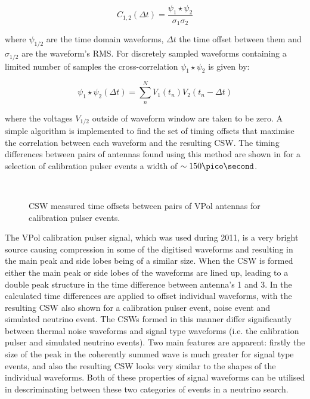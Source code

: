\begin{equation}
  C_{1,2}(\Delta t) = \frac{\psi_{1} \star \psi_{2}}{\sigma_{1} \sigma_{2}}
  \label{eq:analysis:Reconstruction:Normalised-Cross-Correlation}
\end{equation}

\noindent where $\psi_{1/2}$ are the time domain waveforms, $\Delta t$ the time offset between them and $\sigma_{1/2}$ are the waveform's RMS. For discretely sampled waveforms containing a limited number of samples the cross-correlation $\psi_{1} \star \psi_{2}$ is given by:

\begin{equation}
  \psi_{1} \star \psi_{2} (\Delta t) = \sum_{n}^{N} V_{1}(t_{n}) V_{2}(t_{n}-\Delta t)
  \label{eq:analysis:Reconstruction:Discrete-Cross-Correlation}
\end{equation}

\noindent where the voltages $V_{1/2}$ outside of waveform window are taken to be zero. A simple algorithm is implemented to find the set of timing offsets that maximise the correlation between each waveform and the resulting CSW. The timing differences between pairs of antennas found using this method are shown in  for a selection of calibration pulser events a width of $\sim 150 \pico \second$. 

\begin{figure}[htpb]
  \hfill
  \\
  \caption{CSW measured time offsets between pairs of VPol antennas for calibration pulser events.}
  \label{fig:analysis:Reconstruction:CSW-DeltaT}
\end{figure}


The VPol calibration pulser signal, which was used during 2011, is a very bright source causing compression in some of the digitised waveforms and resulting in the main peak and side lobes being of a similar size. When the CSW is formed either the main peak or side lobes of the waveforms are lined up, leading to a double peak structure in the time difference between antenna's 1 and 3. In  the calculated time differences are applied to offset individual waveforms, with the resulting CSW also shown for a calibration pulser event, noise event and simulated neutrino event. The CSWs formed in this manner differ significantly between thermal noise waveforms and signal type waveforms (i.e. the calibration pulser and simulated neutrino events). Two main features are apparent: firstly the size of the peak in the coherently summed wave is much greater for signal type events, and also the resulting CSW looks very similar to the shapes of the individual waveforms. Both of these properties of signal waveforms can be utilised in descriminating between these two categories of events in a neutrino search.


